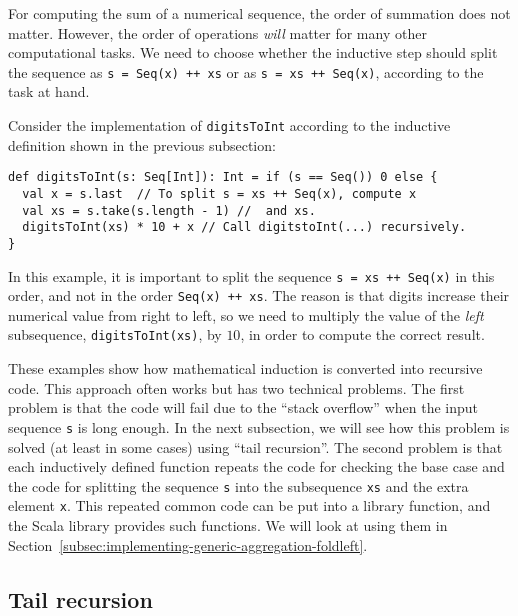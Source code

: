 For computing the sum of a numerical sequence, the order of summation
does not matter. However, the order of operations \emph{will} matter
for many other computational tasks. We need to choose whether the
inductive step should split the sequence as \lstinline!s = Seq(x) ++ xs!
or as \lstinline!s = xs ++ Seq(x)!,
according to the task at hand.

Consider the implementation of \lstinline!digitsToInt!
according to the inductive definition shown in the previous subsection:
\begin{lstlisting}
def digitsToInt(s: Seq[Int]): Int = if (s == Seq()) 0 else {
  val x = s.last  // To split s = xs ++ Seq(x), compute x
  val xs = s.take(s.length - 1) //  and xs.
  digitsToInt(xs) * 10 + x // Call digitstoInt(...) recursively.
}
\end{lstlisting}
In this example, it is important to split the sequence \lstinline!s = xs ++ Seq(x)!
in this order, and not in the order \lstinline!Seq(x) ++ xs!.
The reason is that digits increase their numerical value from right
to left, so we need to multiply the value of the \emph{left} subsequence,
\lstinline!digitsToInt(xs)!,
by $10$, in order to compute the correct result.

These examples show how mathematical induction is converted into recursive
code. This approach often works but has two technical problems. The
first problem is that the code will fail due to the ``stack overflow''
when the input sequence \lstinline!s!
is long enough. In the next subsection, we will see how this problem
is solved (at least in some cases) using ``tail recursion''. The
second problem is that each inductively defined function repeats the
code for checking the base case and the code for splitting the sequence
\lstinline!s! into the
subsequence \lstinline!xs!
and the extra element \lstinline!x!.
This repeated common code can be put into a library function, and
the Scala library provides such functions. We will look at using them
in Section~\ref{subsec:implementing-generic-aggregation-foldleft}.

\subsection{Tail recursion\label{subsec:Tail-recursion}}


